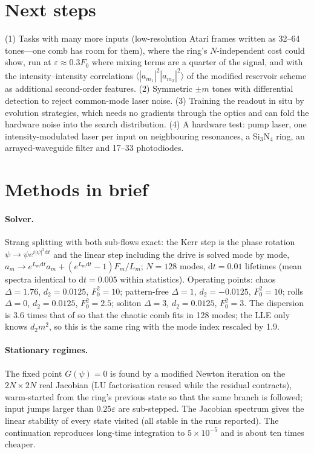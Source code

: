 \documentclass[10pt,a4paper]{article}
\newcommand{\Fz}{F_0}
\begin{document}
\section{Next steps}
(1) Tasks with many more inputs (low-resolution Atari frames written as 32--64 tones---one comb has room for them),
where the ring's $N$-independent cost could show, run at $\varepsilon\approx0.3\Fz$ where mixing terms are a quarter of the
signal, and with the intensity--intensity correlations $\langle|a_{m_1}|^2|a_{m_2}|^2\rangle$ of the
modified reservoir scheme as additional second-order features.  (2) Symmetric $\pm m$ tones with differential detection to
reject common-mode laser noise.  (3) Training the readout in situ by evolution strategies, which needs no gradients through
the optics and can fold the hardware noise into the search distribution.  (4) A hardware test: pump laser, one
intensity-modulated laser per input on neighbouring resonances, a Si$_3$N$_4$ ring, an arrayed-waveguide filter and 17--33 photodiodes.

\appendix
\section{Methods in brief}
\paragraph{Solver.}  Strang splitting with both sub-flows exact: the Kerr step is the phase rotation
$\psi\to\psi e^{i|\psi|^2\mathrm{d}t}$ and the linear step including the drive is solved mode by mode,
$a_m\to e^{L_m\mathrm{d}t}a_m+(e^{L_m\mathrm{d}t}-1)F_m/L_m$; $N=128$ modes, $\mathrm{d}t=0.01$ lifetimes (mean spectra identical to
$\mathrm{d}t=0.005$ within statistics).  Operating points: chaos $\Delta=1.76$, $d_2=0.0125$, $\Fz^2=10$; pattern-free
$\Delta=1$, $d_2=-0.0125$, $\Fz^2=10$; rolls $\Delta=0$, $d_2=0.0125$, $\Fz^2=2.5$; soliton $\Delta=3$, $d_2=0.0125$, $\Fz^2=3$.
The dispersion is 3.6 times that of \cite{ref:prr_2025} so that the chaotic comb fits in 128 modes; the LLE only
knows $d_2m^2$, so this is the same ring with the mode index rescaled by 1.9.
\paragraph{Stationary regimes.}  The fixed point $G(\psi)=0$ is found by a modified Newton iteration on the $2N\times2N$
real Jacobian (LU factorisation reused while the residual contracts), warm-started from the ring's previous state so that the
same branch is followed; input jumps larger than $0.25\varepsilon$ are sub-stepped.  The Jacobian spectrum gives the
linear stability of every state visited (all stable in the runs reported).  The continuation reproduces long-time
integration to $5\times10^{-5}$ and is about ten times cheaper.
\end{document}
